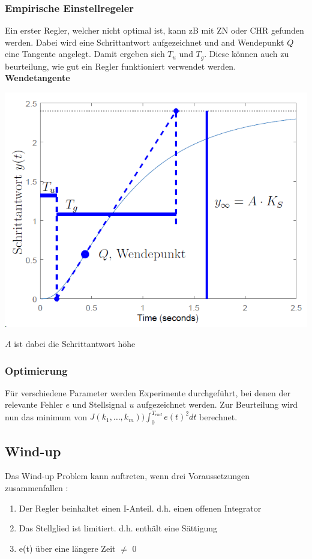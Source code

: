 \subsubsection{Empirische Einstellregeler}
Ein erster Regler, welcher nicht optimal ist, kann zB mit ZN oder CHR gefunden werden. Dabei wird eine Schrittantwort aufgezeichnet und and Wendepunkt $Q$ eine Tangente angelegt. Damit ergeben sich $T_u$ und $T_g$. Diese können auch zu beurteilung, wie gut ein Regler funktioniert verwendet werden. 
~\\
\noindent\textbf{Wendetangente}
\begin{center}
	\includegraphics[width=0.8\columnwidth]{Images/wendetangente}
\end{center}
$A$ ist dabei die Schrittantwort höhe

\subsubsection{Optimierung}
Für verschiedene Parameter werden Experimente durchgeführt, bei denen der relevante Fehler $e$ und Stellsignal $u$ aufgezeichnet werden. Zur Beurteilung wird nun das minimum von $J(k_1, \dots, k_m) ) \int_{0}^{T_{end}}e(t)^2dt$ berechnet.

\subsection{Wind-up}
Das Wind-up Problem kann auftreten, wenn drei Voraussetzungen zusammenfallen :
\begin{enumerate}[nosep]
	\item Der Regler beinhaltet einen I-Anteil. d.h. einen offenen Integrator
	\item Das Stellglied ist limitiert. d.h. enthält eine Sättigung
	\item e(t) über eine längere Zeit $\neq$ 0
\end{enumerate}

